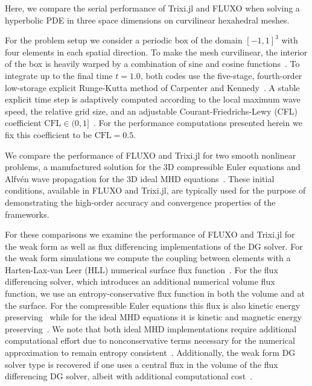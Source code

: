 \documentclass[hidelinks]{juliacon} %
\newcommand{\trixi}{Trixi.jl\xspace}
\begin{document}
Here, we compare the serial performance of \trixi and FLUXO when solving a
hyperbolic PDE in three space dimensions on curvilinear hexahedral meshes.

For the problem setup we consider a periodic box of the domain $[-1,1]^3$ with four elements in each
spatial direction. To make the mesh curvilinear, the interior of the box is heavily warped
by a combination of sine and cosine functions~\cite{chan2019efficient}. To integrate up to the
final time $t=1.0$, both codes use the five-stage, fourth-order low-storage explicit
Runge-Kutta method of Carpenter and Kennedy~\cite{CarpenterKennedy1994}.
A stable explicit time step is adaptively computed according to the local maximum wave
speed, the relative grid size, and an adjustable Courant-Friedrichs-Lewy (CFL)
coefficient $\text{CFL}\in(0,1]$~\cite{gassner2011}. For the performance computations presented herein
we fix this coefficient to be $\text{CFL}=0.5$.

We compare the performance of FLUXO and \trixi for two smooth nonlinear problems,
a manufactured solution for the 3D compressible Euler equations and Alfv\'{e}n wave propagation for
the 3D ideal MHD equations~\cite{gassner2009,altmann2012}. These initial conditions, available in FLUXO and
\trixi, are typically used for the purpose of demonstrating the high-order accuracy and convergence properties
of the frameworks.

For these comparisons we examine the performance of FLUXO and \trixi for the weak
form as well as flux differencing implementations of the DG solver. For the weak form simulations we compute
the coupling between elements with a Harten-Lax-van Leer (HLL) numerical surface flux function~\cite{Toro2009,li2005hllc}.
For the flux differencing solver, which introduces an additional numerical volume flux function, we use an entropy-conservative flux
function in both the volume and at the surface. For the compressible Euler equations
this flux is also kinetic energy preserving~\cite{ranocha2020icosahom, ranocha2018thesis}
while for the ideal MHD equations it is kinetic and magnetic energy preserving~\cite{hindenlang2019}. We note that both ideal MHD implementations
require additional computational effort due to nonconservative terms necessary for the numerical approximation
to remain entropy consistent~\cite{bohm2020}. Additionally, the weak form DG solver type is recovered if one uses a central flux
in the volume of the flux differencing DG solver, albeit with additional computational cost~\cite{gassner2016split}.
\end{document}
